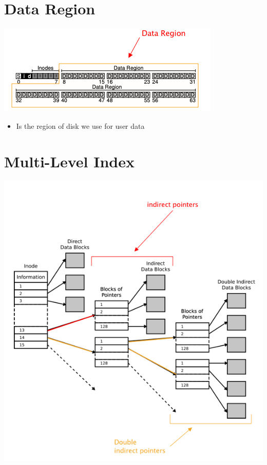\documentclass[12pt]{article}
\begin{document}
\section*{Data Region}

\begin{center}
\includegraphics[width=\linewidth]{images/midterm_1_solution_11.png}
\end{center}

\begin{itemize}
    \item Is the region of disk we use for user data
\end{itemize}

\section*{Multi-Level Index}

\begin{center}
\includegraphics[width=\linewidth]{images/midterm_1_solution_13.png}
\end{center}
\end{document}
